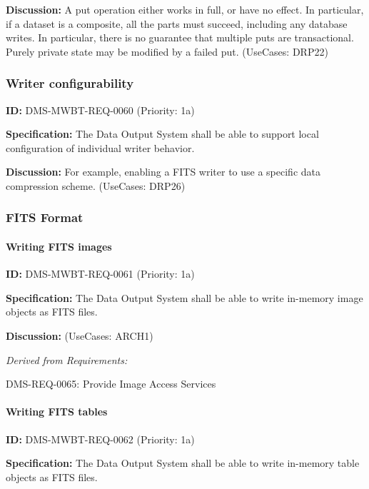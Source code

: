 \documentclass[SE,toc,lsstdraft]{lsstdoc}
\begin{document}
\textbf{Discussion:}
A put operation either works in full, or have no effect. In particular, if a dataset is a composite, all the parts must succeed, including any database writes. In particular, there is no guarantee that multiple puts are transactional.  Purely private state may be modified by a failed put. (UseCases: DRP22)

\subsubsection{Writer configurability}

\label{DMS-MWBT-REQ-0060}
\textbf{ID:} DMS-MWBT-REQ-0060 (Priority: 1a)

\textbf{Specification:}
The Data Output System shall be able to support local configuration of individual writer behavior.

\textbf{Discussion:}
For example, enabling a FITS writer to use a specific data compression scheme. (UseCases: DRP26)

\subsubsection{FITS Format}

\paragraph{Writing FITS images}\hfill  %

\label{DMS-MWBT-REQ-0061}
\textbf{ID:} DMS-MWBT-REQ-0061 (Priority: 1a)

\textbf{Specification:}
The Data Output System shall be able to write in-memory image objects as FITS files.

\textbf{Discussion:}
(UseCases: ARCH1)

\emph{Derived from Requirements:}

DMS-REQ-0065:
Provide Image Access Services \newline

\paragraph{Writing FITS tables}\hfill  %

\label{DMS-MWBT-REQ-0062}
\textbf{ID:} DMS-MWBT-REQ-0062 (Priority: 1a)

\textbf{Specification:}
The Data Output System shall be able to write in-memory table objects as FITS files.
\end{document}
